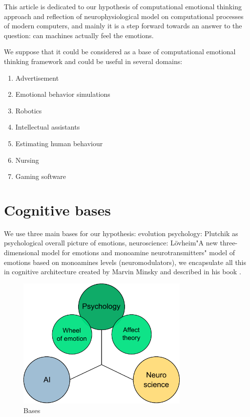 This article is dedicated to our hypothesis of computational emotional thinking approach and reflection of neurophysiological model on computational processes of modern computers, and mainly it is a step forward towards an answer to the question: can machines actually feel the emotions.

We suppose that it could be considered as a base of computational emotional thinking framework and could be useful in several domains:

\begin{enumerate}
 \item  Advertisement
 \item  Emotional behavior simulations
 \item  Robotics
 \item  Intellectual assistants
 \item  Estimating human behaviour
 \item  Nursing
 \item  Gaming software
\end{enumerate}

\section{Cognitive bases}

We use three main bases for our hypothesis: evolution psychology: Plutchik \cite{natureofemotions} as psychological overall picture of emotions, neuroscience: L\"{o}vheim"A new three-dimensional model for emotions and monoamine neurotransmitters" \cite{cubeofemotions} model of emotions based on monoamines levels (neuromodulators), we encapsulate all this in cognitive architecture created by Marvin Minsky and described in his book \cite{emotionmachine}.

\begin{figure}
\begin{center}
 \includegraphics[height=6.5cm]{figure1_3_bases}
\end{center}
\caption{Bases}
\label{figure1_3_bases}
\end{figure}

